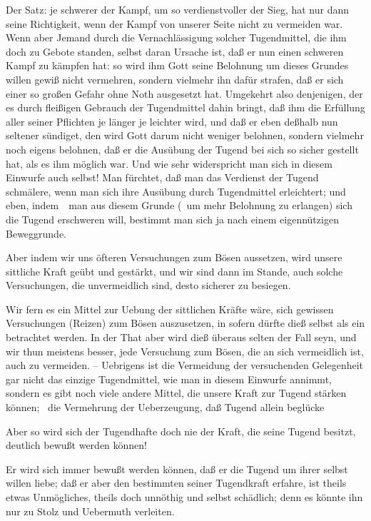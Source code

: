  Der Satz: je schwerer der Kampf, um so verdienstvoller der Sieg, hat nur dann seine Richtigkeit, wenn der Kampf von unserer Seite nicht zu vermeiden war. Wenn aber Jemand durch die Vernachlässigung solcher Tugendmittel, die ihm doch zu Gebote standen, selbst daran Ursache ist, daß er nun einen schweren Kampf zu kämpfen hat: so wird ihm Gott seine Belohnung um dieses Grundes willen gewiß nicht vermehren, sondern vielmehr ihn dafür strafen, daß er sich einer so großen Gefahr ohne Noth ausgesetzt hat. Umgekehrt also denjenigen, der es durch fleißigen Gebrauch der Tugendmittel dahin bringt, daß ihm die Erfüllung aller seiner Pflichten je länger je leichter wird, und daß er eben deßhalb nun seltener sündiget, den wird Gott darum nicht weniger belohnen, sondern vielmehr noch eigens  belohnen, daß er die Ausübung der Tugend bei sich so sicher gestellt hat, als es ihm möglich war. Und wie sehr widerspricht man sich in diesem Einwurfe auch selbst! Man fürchtet, daß man das Verdienst der Tugend schmälere, wenn man sich ihre Ausübung durch Tugendmittel erleichtert; und eben, indem~\ man aus diesem Grunde (\dh\ um mehr Belohnung zu erlangen) sich die Tugend erschweren will, bestimmt man sich ja nach einem eigennützigen Beweggrunde.\par
{} Aber indem wir uns öfteren Versuchungen zum Bösen aussetzen, wird unsere sittliche Kraft geübt und gestärkt, und wir sind dann im Stande, auch solche Versuchungen, die unvermeidlich sind, desto sicherer zu besiegen.\par
{} Wir fern es ein Mittel zur Uebung der sittlichen Kräfte wäre, sich gewissen Versuchungen (Reizen) zum Bösen auszusetzen, in sofern dürfte dieß selbst als ein  betrachtet werden. In der That aber wird dieß überaus selten der Fall seyn, und wir thun meistens besser, jede Versuchung zum Bösen, die an sich vermeidlich ist, auch zu vermeiden. -- Uebrigens ist die Vermeidung der versuchenden Gelegenheit gar nicht das einzige Tugendmittel, wie man in diesem Einwurfe annimmt, sondern es gibt noch viele andere Mittel, die unsere Kraft zur Tugend stärken können; \zB\ die Vermehrung der Ueberzeugung, daß Tugend allein beglücke \udgl\par 
{} Aber so wird sich der Tugendhafte doch nie der Kraft, die seine Tugend besitzt, deutlich bewußt werden können!\par
{} Er wird sich immer bewußt werden können, daß er die Tugend um ihrer selbst willen liebe; daß er aber den bestimmten  seiner Tugendkraft erfahre, ist theils etwas Unmögliches, theils doch unnöthig und selbst schädlich; denn es könnte ihn nur zu Stolz und Uebermuth verleiten.\par
